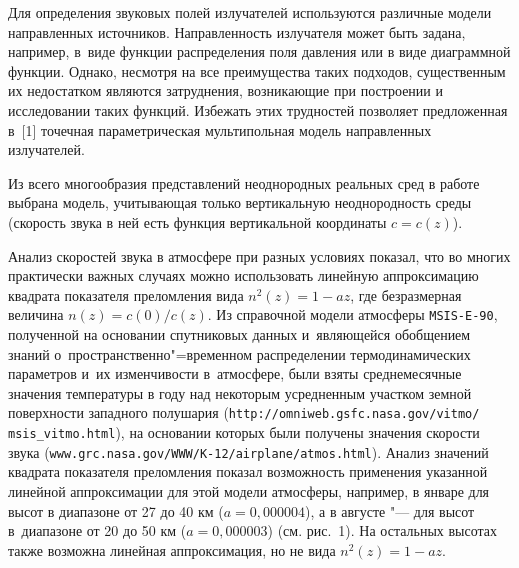 \date{25/V/2009}                                                                                   %




\maketitle

 Для определения звуковых полей излучателей
используются различные модели направленных источников.
Направленность излучателя может быть задана, например, в~виде
функции распределения поля давления или в виде диаграммной функции.
Однако, несмотря на все преимущества таких подходов, существенным их
недостатком являются затруднения, возникающие при построении и
исследовании таких функций.
Избежать этих трудностей позволяет
предложенная в~[1] точечная параметрическая
мультипольная модель направленных излучателей.

Из всего многообразия представлений неоднородных реальных сред в
работе выбрана модель, учитывающая только вертикальную
неоднородность среды (скорость звука в ней есть функция вертикальной
координаты \mbox{$c=c(z)$).}

Анализ скоростей звука в атмосфере при разных условиях показал, что
во многих практически важных случаях можно использовать линейную
аппроксимацию квадрата показателя преломления вида
$n^{2}(z)=1-az$, где безразмерная величина $n(z)=c(0)/c(z)$.
Из справочной модели атмосферы \mbox{\tt MSIS-E-90},
полученной на основании спутниковых данных и~являющейся обобщением знаний
о~пространственно"=временном распределении термодинамических
параметров и~их изменчивости в~атмосфере, были взяты среднемесячные
значения температуры в году над некоторым усредненным участком
земной поверхности западного полушария ({\tt\footnotesize  http://omniweb.gsfc.nasa.gov/vitmo/ msis\_vitmo.html}), на основании
которых были получены значения скорости звука ({\tt\footnotesize www.grc.nasa.gov/WWW/K-12/airplane/atmos.html}). Анализ значений
квадрата показателя преломления показал возможность применения
указанной линейной аппроксимации для этой модели атмосферы,
например, в январе для высот в диапазоне от 27 до 40 км
($a=0,000004$), а в августе "--- для высот в~диапазоне от 20 до 50 км
($a=0,000003$) (см. рис.~1).
На остальных высотах также возможна линейная аппроксимация, но не вида $n^{2}(z)=1-az$.

